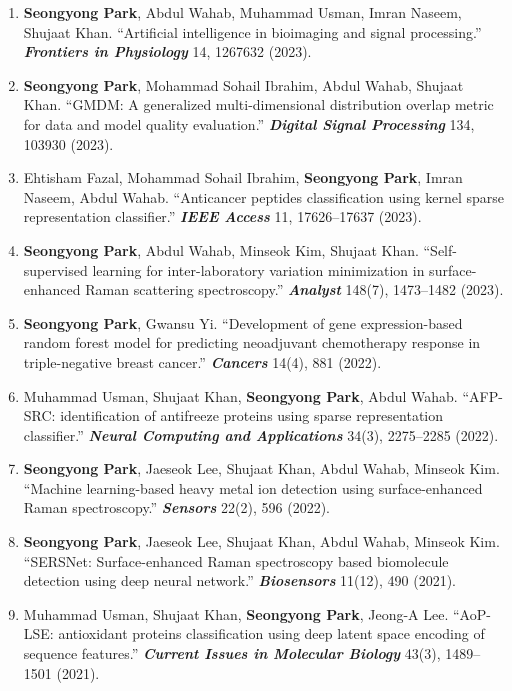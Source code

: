 \begin{scriptsize}
\begin{enumerate}
    \item \textbf{Seongyong Park}, Abdul Wahab, Muhammad Usman, Imran Naseem, Shujaat Khan. ``Artificial intelligence in bioimaging and signal processing.'' \textit{\textbf{Frontiers in Physiology}} 14, 1267632 (2023).

    \item \textbf{Seongyong Park}, Mohammad Sohail Ibrahim, Abdul Wahab, Shujaat Khan. ``GMDM: A generalized multi-dimensional distribution overlap metric for data and model quality evaluation.'' \textit{\textbf{Digital Signal Processing}} 134, 103930 (2023).

    \item Ehtisham Fazal, Mohammad Sohail Ibrahim, \textbf{Seongyong Park}, Imran Naseem, Abdul Wahab. ``Anticancer peptides classification using kernel sparse representation classifier.'' \textit{\textbf{IEEE Access}} 11, 17626--17637 (2023).

    \item \textbf{Seongyong Park}, Abdul Wahab, Minseok Kim, Shujaat Khan. ``Self-supervised learning for inter-laboratory variation minimization in surface-enhanced Raman scattering spectroscopy.'' \textit{\textbf{Analyst}} 148(7), 1473--1482 (2023).

    \item \textbf{Seongyong Park}, Gwansu Yi. ``Development of gene expression-based random forest model for predicting neoadjuvant chemotherapy response in triple-negative breast cancer.'' \textit{\textbf{Cancers}} 14(4), 881 (2022).

    \item Muhammad Usman, Shujaat Khan, \textbf{Seongyong Park}, Abdul Wahab. ``AFP-SRC: identification of antifreeze proteins using sparse representation classifier.'' \textit{\textbf{Neural Computing and Applications}} 34(3), 2275--2285 (2022).

    \item \textbf{Seongyong Park}, Jaeseok Lee, Shujaat Khan, Abdul Wahab, Minseok Kim. ``Machine learning-based heavy metal ion detection using surface-enhanced Raman spectroscopy.'' \textit{\textbf{Sensors}} 22(2), 596 (2022).

    \item \textbf{Seongyong Park}, Jaeseok Lee, Shujaat Khan, Abdul Wahab, Minseok Kim. ``SERSNet: Surface-enhanced Raman spectroscopy based biomolecule detection using deep neural network.'' \textit{\textbf{Biosensors}} 11(12), 490 (2021).

    \item Muhammad Usman, Shujaat Khan, \textbf{Seongyong Park}, Jeong-A Lee. ``AoP-LSE: antioxidant proteins classification using deep latent space encoding of sequence features.'' \textit{\textbf{Current Issues in Molecular Biology}} 43(3), 1489--1501 (2021).


\end{enumerate}
\end{scriptsize}
